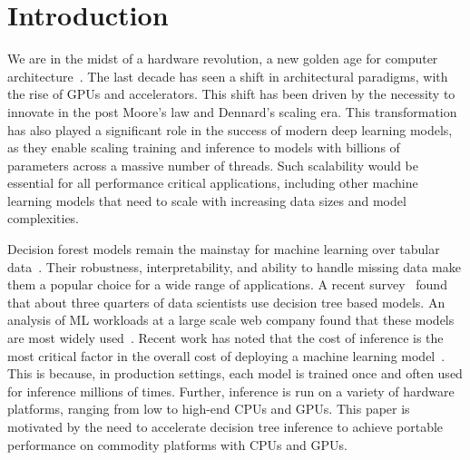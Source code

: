 \section{Introduction}
\label{sec:intro}
We are in the midst of a hardware revolution, a new golden age for computer architecture~\cite{GoldenAge}. The last 
decade has seen a shift in architectural paradigms, with the rise of GPUs and accelerators. This shift has been driven
by the necessity to innovate in the post Moore's law and Dennard's scaling era. This transformation has also played 
a significant role in the success of modern deep learning models, as they enable scaling 
training and inference to models with billions of parameters across a massive number of threads. 
Such scalability would be essential for all performance critical applications, including
other machine learning models that need to scale with increasing data sizes and model complexities. 

Decision forest models remain the mainstay for machine learning over tabular data~\cite{DLNotAllYouNeed,TreebasedOutperformDL}. 
Their robustness, interpretability, and ability to handle missing data make them a popular choice for a wide 
range of applications\cite{DecisionTreesOverview, Med1, Med2, Facebook, LHCModel, Finance}. 
A recent survey~\cite{KaggleSurvey} found that about three quarters of data scientists use decision tree
based models. An analysis of ML workloads at a large scale web company found that these models are most widely used~\cite{LookingGlass}. 
Recent work has noted that the cost of inference is the most critical factor in the overall cost of 
deploying a machine learning model~\cite{Hummingbird, SageMaker}.
This is because, in production settings, each model is trained once and often used for inference millions of times. 
Further, inference is run on a variety of hardware platforms, ranging from low to high-end CPUs and GPUs. 
This paper is motivated by the need to accelerate decision tree inference to achieve portable performance on 
commodity platforms with CPUs and GPUs. 

